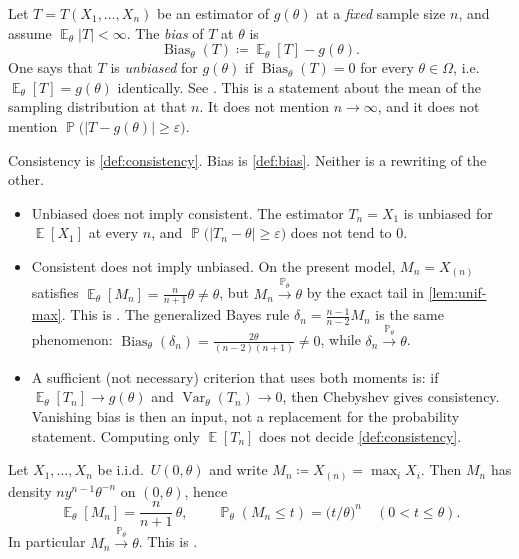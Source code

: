 \documentclass[11pt,a4paper]{article}
\DeclareMathOperator{\Var}{Var}
\DeclareMathOperator{\E}{\mathbb{E}}
\DeclareMathOperator{\Pbb}{\mathbb{P}}
\begin{document}
\begin{definition}
\label{def:bias}
Let \( T=T(X_1,\dots,X_n) \) be an estimator of \( g(\theta) \) at a \emph{fixed} sample size \( n \), and assume \( \E_\theta|T|<\infty \). The \emph{bias} of \( T \) at \( \theta \) is
\[
\operatorname{Bias}_\theta(T)
\coloneqq
\E_\theta[T]-g(\theta).
\]
One says that \( T \) is \emph{unbiased} for \( g(\theta) \) if \( \operatorname{Bias}_\theta(T)=0 \) for every \( \theta\in\Omega \), i.e.\ \( \E_\theta[T]=g(\theta) \) identically. See \citep[\S2.8, \S5.1.1]{hogg2019}. This is a statement about the mean of the sampling distribution at that \( n \). It does not mention \( n\to\infty \), and it does not mention \( \Pbb\bigl(|T-g(\theta)|\ge\varepsilon\bigr) \).
\end{definition}

\begin{remark}
\label{rem:consist-vs-bias}
Consistency is \cref{def:consistency}. Bias is \cref{def:bias}. Neither is a rewriting of the other.
\begin{itemize}
    \item
    Unbiased does not imply consistent. The estimator \( T_n=X_1 \) is unbiased for \( \E[X_1] \) at every \( n \), and \( \Pbb\bigl(|T_n-\theta|\ge\varepsilon\bigr) \) does not tend to \( 0 \).
    \item
    Consistent does not imply unbiased. On the present model, \( M_n=X_{(n)} \) satisfies \( \E_\theta[M_n]=\frac{n}{n+1}\theta\neq\theta \), but \( M_n\xrightarrow{\Pbb_\theta}\theta \) by the exact tail in \cref{lem:unif-max}. This is \citep[Example~5.1.2]{hogg2019}. The generalized Bayes rule \( \delta_n=\frac{n-1}{n-2}M_n \) is the same phenomenon: \( \operatorname{Bias}_\theta(\delta_n)=\frac{2\theta}{(n-2)(n+1)}\neq 0 \), while \( \delta_n\xrightarrow{\Pbb_\theta}\theta \).
    \item
    A sufficient (not necessary) criterion that uses both moments is: if \( \E_\theta[T_n]\to g(\theta) \) and \( \Var_\theta(T_n)\to 0 \), then Chebyshev gives consistency. Vanishing bias is then an input, not a replacement for the probability statement. Computing only \( \E[T_n] \) does not decide \cref{def:consistency}.
\end{itemize}
\end{remark}

\begin{lemma}
\label{lem:unif-max}
Let \( X_1,\dots,X_n \) be i.i.d.\ \( U(0,\theta) \) and write \( M_n\coloneqq X_{(n)}=\max_i X_i \). Then \( M_n \) has density \( n y^{n-1}\theta^{-n} \) on \( (0,\theta) \), hence
\[
\E_\theta[M_n]
=
\frac{n}{n+1}\,\theta,
\qquad
\Pbb_\theta(M_n\le t)
=
\bigl(t/\theta\bigr)^{n}
\quad(0<t\le\theta).
\]
In particular \( M_n\xrightarrow{\Pbb_\theta}\theta \). This is \citep[Example~5.1.2]{hogg2019}.
\end{lemma}
\end{document}
